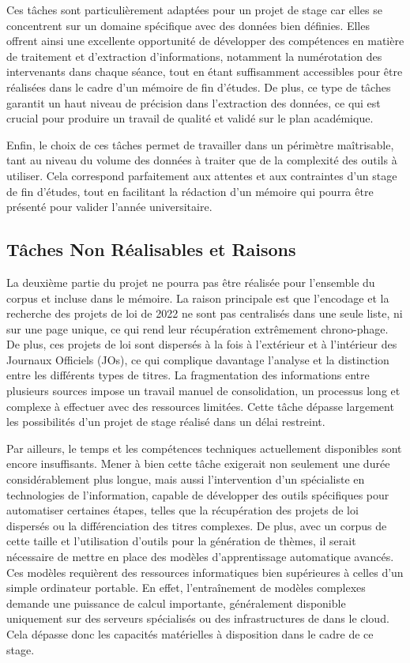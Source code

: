 Ces tâches sont particulièrement adaptées pour un projet de stage car elles se concentrent sur un domaine spécifique avec des données bien définies. Elles offrent ainsi une excellente opportunité de développer des compétences en matière de traitement et d'extraction d'informations, notamment la numérotation des intervenants dans chaque séance, tout en étant suffisamment accessibles pour être réalisées dans le cadre d'un mémoire de fin d'études. De plus, ce type de tâches garantit un haut niveau de précision dans l'extraction des données, ce qui est crucial pour produire un travail de qualité et validé sur le plan académique.

Enfin, le choix de ces tâches permet de travailler dans un périmètre maîtrisable, tant au niveau du volume des données à traiter que de la complexité des outils à utiliser. Cela correspond parfaitement aux attentes et aux contraintes d'un stage de fin d'études, tout en facilitant la rédaction d'un mémoire qui pourra être présenté pour valider l'année universitaire.


\subsection{Tâches Non Réalisables et Raisons}

La deuxième partie du projet ne pourra pas être réalisée pour l'ensemble du corpus et incluse dans le mémoire. La raison principale est que l'encodage et la recherche des projets de loi de 2022 ne sont pas centralisés dans une seule liste, ni sur une page unique, ce qui rend leur récupération extrêmement chrono-phage. De plus, ces projets de loi sont dispersés à la fois à l'extérieur et à l'intérieur des Journaux Officiels (JOs), ce qui complique davantage l'analyse et la distinction entre les différents types de titres. La fragmentation des informations entre plusieurs sources impose un travail manuel de consolidation, un processus long et complexe à effectuer avec des ressources limitées. Cette tâche dépasse largement les possibilités d'un projet de stage réalisé dans un délai restreint.

Par ailleurs, le temps et les compétences techniques actuellement disponibles sont encore insuffisants. Mener à bien cette tâche exigerait non seulement une durée considérablement plus longue, mais aussi l'intervention d'un spécialiste en technologies de l'information, capable de développer des outils spécifiques pour automatiser certaines étapes, telles que la récupération des projets de loi dispersés ou la différenciation des titres complexes. De plus, avec un corpus de cette taille et l'utilisation d'outils pour la génération de thèmes, il serait nécessaire de mettre en place des modèles d'apprentissage automatique avancés. Ces modèles requièrent des ressources informatiques bien supérieures à celles d'un simple ordinateur portable. En effet, l'entraînement de modèles complexes demande une puissance de calcul importante, généralement disponible uniquement sur des serveurs spécialisés ou des infrastructures de dans le \gls{cloud}. Cela dépasse donc les capacités matérielles à disposition dans le cadre de ce stage.


